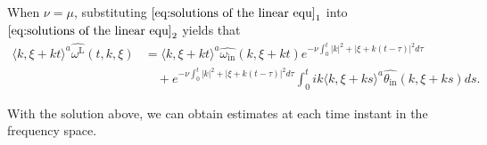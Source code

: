 \documentclass[reqno, 12pt]{amsart} %
\theoremstyle{plain} %
\theoremstyle{definition}
\theoremstyle{remark}
\numberwithin{equation}{section} %
\begin{document}
	When $\nu =\mu$, substituting $\eqref{eq:solutions of the linear equ}_1$ into $\eqref{eq:solutions of the linear equ}_2$ yields that
	\begin{equation}\begin{aligned} \label{eq:solutions of the linear equ2}
			\langle k, \xi + kt \rangle^a  \widehat{\omega^{\mathrm{L}} }(t, k, \xi)& = \langle k, \xi + kt \rangle^a  \widehat{\omega_{\text {in}} }(k, \xi+kt) e^{-\nu \int_0^t|k|^2+|\xi+k(t-\tau)|^2 d \tau}\\
			&\quad  +  e^{-\nu \int_0^t|k|^2+|\xi+k(t-\tau)|^2 d \tau} \int_0^t ik \langle k, \xi + ks \rangle^a   \widehat{\theta_{\text {in}} }(k, \xi+k s) ds.
	\end{aligned}\end{equation}
	
	With the solution above, we can obtain estimates at each time instant in the frequency space.
	
\end{document}
